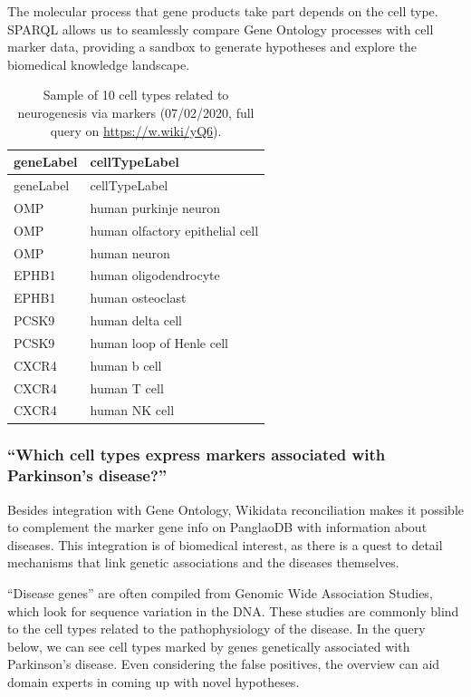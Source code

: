 The molecular process that gene products take part depends on the cell type. SPARQL allows us to seamlessly compare Gene Ontology processes with cell marker data, providing a sandbox to generate hypotheses and explore the biomedical knowledge landscape.

\begin{longtable}[]{@{}ll@{}}
\caption{Sample of 10 cell types related to neurogenesis via markers (07/02/2020, full query on \url{https://w.wiki/yQ6}).
\label{tbl:neuro}}\tabularnewline
\toprule
geneLabel & cellTypeLabel \\
\midrule
\endfirsthead
\toprule
geneLabel & cellTypeLabel \\
\midrule
\endhead
OMP & human purkinje neuron \\
OMP & human olfactory epithelial cell \\
OMP & human neuron \\
EPHB1 & human oligodendrocyte \\
EPHB1 & human osteoclast \\
PCSK9 & human delta cell \\
PCSK9 & human loop of Henle cell \\
CXCR4 & human b cell \\
CXCR4 & human T cell \\
CXCR4 & human NK cell \\
\bottomrule
\end{longtable}

\hypertarget{which-cell-types-express-markers-associated-with-parkinsons-disease}{%
\subsubsection{``Which cell types express markers associated with Parkinson's disease?''}\label{which-cell-types-express-markers-associated-with-parkinsons-disease}}

Besides integration with Gene Ontology, Wikidata reconciliation makes it possible to complement the marker gene info on PanglaoDB with information about diseases. This integration is of biomedical interest, as there is a quest to detail mechanisms that link genetic associations and the diseases themselves.

``Disease genes'' are often compiled from Genomic Wide Association Studies, which look for sequence variation in the DNA. These studies are commonly blind to the cell types related to the pathophysiology of the disease. In the query below, we can see cell types marked by genes genetically associated with Parkinson's disease. Even considering the false positives, the overview can aid domain experts in coming up with novel hypotheses.

